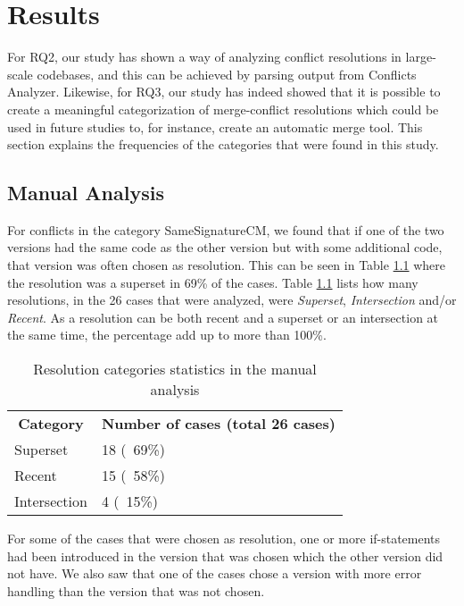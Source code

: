 \chapter{Results}
For RQ2, our study has shown a way of analyzing conflict resolutions in large-scale codebases, and this can be achieved by parsing output from Conflicts Analyzer. Likewise, for RQ3, our study has indeed showed that it is possible to create a meaningful categorization of merge-conflict resolutions which could be used in future studies to, for instance, create an automatic merge tool. This section explains the frequencies of the categories that were found in this study.
\section{Manual Analysis}
For conflicts in the category SameSignatureCM, we found that if one of the two versions had the same code as the other version but with some additional code, that version was often chosen as resolution. This can be seen in Table \ref{table:rcsitma} where the resolution was a superset in 69\% of the cases. Table \ref{table:rcsitma} lists how many resolutions, in the 26 cases that were analyzed, were \textit{Superset}, \textit{Intersection} and/or \textit{Recent}. As a resolution can be both recent and a superset or an intersection at the same time, the percentage add up to more than 100\%.
\begin{table}
\caption{Resolution categories statistics in the manual analysis}\label{table:rcsitma}
\begin{tabular}{ p{6cm} p{6cm} }
\hline
\multicolumn{1}{c}{\textbf{Category}} & \multicolumn{1}{c}{\textbf{Number of cases (total 26 cases)}}\\
Superset & 18 (~69\%)\\
Recent & 15 (~58\%)\\
Intersection & 4 (~15\%)\\
\end{tabular}
\end{table}
\FloatBarrier
For some of the cases that were chosen as resolution, one or more if-statements had been introduced in the version that was chosen which the other version did not have. We also saw that one of the cases chose a version with more error handling than the version that was not chosen.

